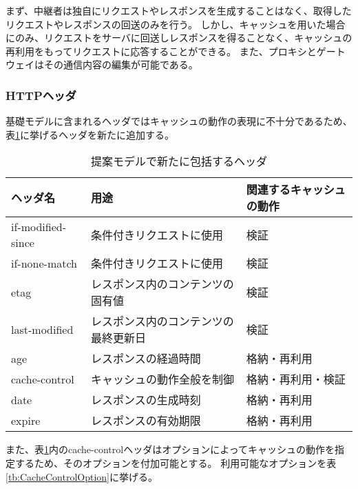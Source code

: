 \documentclass[journal]{IEEEtran}
\begin{document}
まず、中継者は独自にリクエストやレスポンスを生成することはなく、取得したリクエストやレスポンスの回送のみを行う。
しかし、キャッシュを用いた場合にのみ、リクエストをサーバに回送しレスポンスを得ることなく、キャッシュの再利用をもってリクエストに応答することができる。
また、プロキシとゲートウェイはその通信内容の編集が可能である。

\subsubsection{HTTPヘッダ}
基礎モデルに含まれるヘッダではキャッシュの動作の表現に不十分であるため、表\ref{tb:ProposedModel-Headers}に挙げるヘッダを新たに追加する。

\begin{table}[htb]
\centering
\caption{提案モデルで新たに包括するヘッダ}
\label{tb:ProposedModel-Headers}
\begin{tabular}{lll}
\hline
ヘッダ名 & 用途 & 関連するキャッシュの動作 \\
\hline
if-modified-since & 条件付きリクエストに使用 & 検証 \\
if-none-match & 条件付きリクエストに使用 & 検証 \\
etag & レスポンス内のコンテンツの固有値 & 検証 \\
last-modified & レスポンス内のコンテンツの最終更新日 & 検証 \\
age & レスポンスの経過時間 & 格納・再利用 \\
cache-control & キャッシュの動作全般を制御 & 格納・再利用・検証 \\
date & レスポンスの生成時刻 & 格納・再利用 \\
expire & レスポンスの有効期限 & 格納・再利用 \\
\hline
\end{tabular}
\end{table}

また、表\ref{tb:ProposedModel-Headers}内のcache-controlヘッダはオプションによってキャッシュの動作を指定するため、そのオプションを付加可能とする。
利用可能なオプションを表\ref{tb:CacheControlOption}に挙げる。
\end{document}

